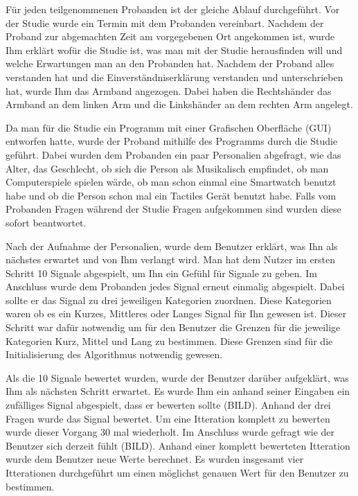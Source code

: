 F{\"u}r jeden teilgenommenen Probanden ist der gleiche Ablauf durchgef{\"u}hrt. 
Vor der Studie wurde ein Termin mit dem Probanden vereinbart. Nachdem der Proband zur abgemachten Zeit am vorgegebenen Ort angekommen ist, wurde Ihm erkl{\"a}rt wof{\"u}r die Studie ist, was man mit der Studie herausfinden will und welche Erwartungen man an den Probanden hat. 
Nachdem der Proband alles verstanden hat und die Einverst{\"a}ndniserkl{\"a}rung verstanden und unterschrieben hat, wurde Ihm das Armband angezogen. Dabei haben die Rechtsh{\"a}nder das Armband an dem linken Arm und die Linksh{\"a}nder an dem rechten Arm angelegt.

Da man f{\"u}r die Studie ein Programm mit einer Grafischen Oberfl{\"a}che (GUI) entworfen hatte, wurde der Proband mithilfe des Programms durch die Studie gef{\"u}hrt.
Dabei wurden dem Probanden ein paar Personalien abgefragt, wie das Alter, das Geschlecht, ob sich die Person als Musikalisch empfindet, ob man Computerspiele spielen w{\"a}rde, ob man schon einmal eine Smartwatch benutzt habe und ob die Person schon mal ein Tactiles Ger{\"a}t benutzt habe. Falls vom Probanden Fragen w{\"a}hrend der Studie Fragen aufgekommen sind wurden diese sofort beantwortet. 

Nach der Aufnahme der Personalien, wurde dem Benutzer erkl{\"a}rt, was Ihn als n{\"a}chstes erwartet und von Ihm verlangt wird. 
Man hat dem Nutzer im ersten Schritt 10 Signale abgespielt, um Ihn ein Gef{\"u}hl f{\"u}r Signale zu geben. Im Anschluss wurde dem Probanden jedes Signal erneut einmalig abgespielt. Dabei sollte er das Signal zu drei jeweiligen Kategorien zuordnen. Diese Kategorien waren ob es ein Kurzes, Mittleres oder Langes Signal f{\"u}r Ihn gewesen ist. Dieser Schritt war daf{\"u}r notwendig um f{\"u}r den Benutzer die Grenzen f{\"u}r die jeweilige Kategorien Kurz, Mittel und Lang zu bestimmen. 
Diese Grenzen sind f{\"u}r die Initialisierung des Algorithmus notwendig gewesen. 

Als die 10 Signale bewertet wurden, wurde der Benutzer dar{\"u}ber aufgekl{\"a}rt, was Ihm als n{\"a}chsten Schritt erwartet. Es wurde Ihm ein anhand seiner Eingaben ein zuf{\"a}lliges Signal abgespielt, dass er bewerten sollte (BILD). Anhand der drei Fragen wurde das Signal bewertet. Um eine Itteration komplett zu bewerten wurde dieser Vorgang 30 mal wiederholt. Im Anschluss wurde gefragt wie der Benutzer sich derzeit f{\"u}hlt (BILD). Anhand einer komplett bewerteten Itteration wurde dem Benutzer neue Werte berechnet. Es wurden insgesamt vier Itterationen durchgef{\"u}hrt um einen m{\"o}glichst genauen Wert f{\"u}r den Benutzer zu bestimmen.

